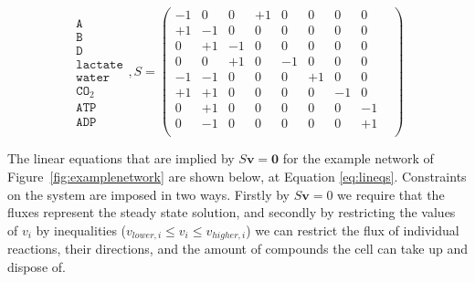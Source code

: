 \documentclass[a4paper,12pt]{article}
\begin{document}
	\begin{equation}
	\begin{matrix}
		\texttt{A}   \\
		\texttt{B}\\
		\texttt{D}\\
		\texttt{lactate}\\
		\texttt{water}\\
		\texttt{CO}_2\\
		\texttt{ATP}\\
		\texttt{ADP}
	\end{matrix}
	,S=
	\begin{pmatrix}
			  -1 &  0 &  0 & +1 &  0 &  0 & 0 & 0 & \\ 
			  +1 & -1 &  0 &  0 &  0 &  0 & 0 &0 &  \\ 
			  0 & +1 & -1 &  0 &  0 &  0 & 0 & 0 & \\ 
			  0  &  0 & +1 &  0 & -1 &  0 & 0 & 0 & \\ 
			  -1 & -1 &  0 &  0 &  0 &+1  & 0 & 0 & \\ 
			  +1 & +1 &  0 &  0 &  0 &  0 & -1&0 &  \\ 
			  0 & +1 &  0 &  0 &  0 & 0 &0 & -1 &\\ 
			  0 & -1 &  0 &  0 &  0 & 0 &0 & +1 & \\ 
			  
		\end{pmatrix} 
		\label{eq:examplematrix}
	\end{equation}


	The linear equations that are implied by $S\mathbf{v}=\mathbf{0}$ for the example network of Figure~\ref{fig:examplenetwork} are shown below, at Equation \ref{eq:lineqs}. Constraints on the system are imposed in two ways. Firstly by $S\mathbf{v}=0$ we require that the fluxes represent the steady state solution, and secondly by restricting the values of $v_i$ by inequalities ($v_{lower,i}\leq v_i \leq v_{higher,i}$) we can restrict the flux of individual reactions, their directions, and the amount of compounds the cell can take up and dispose of. 
	
\end{document}
